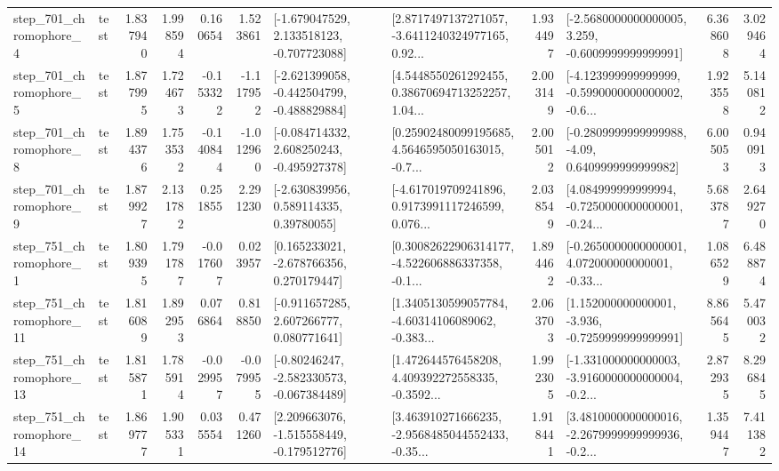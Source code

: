 \begin{tabular}{llrrrrllrlrr}
   step\_701\_chromophore\_4 &      test &      1.837940 &    1.998594 &      0.160654 &  1.523861 &   [-1.679047529, 2.133518123, -0.707723088] &  [2.8717497137271057, -3.6411240324977165, 0.92... &       1.934497 &  [-2.5680000000000005, 3.259, -0.6009999999999991] &            6.368608 &          3.029464 \\
   step\_701\_chromophore\_5 &      test &      1.877995 &    1.724673 &     -0.153322 & -1.117952 &  [-2.621399058, -0.442504799, -0.488829884] &  [4.5448550261292455, 0.38670694713252257, 1.04... &       2.003149 &  [-4.123999999999999, -0.5990000000000002, -0.6... &            1.923558 &          5.140812 \\
   step\_701\_chromophore\_8 &      test &      1.894376 &    1.753532 &     -0.140844 & -1.012960 &   [-0.084714332, 2.608250243, -0.495927378] &  [0.25902480099195685, 4.5646595050163015, -0.7... &       2.005012 &   [-0.2809999999999988, -4.09, 0.6409999999999982] &            6.005053 &          0.940913 \\
   step\_701\_chromophore\_9 &      test &      1.879927 &    2.131782 &      0.251855 &  2.291230 &     [-2.630839956, 0.589114335, 0.39780055] &  [-4.617019709241896, 0.9173991117246599, 0.076... &       2.038549 &  [4.084999999999994, -0.7250000000000001, -0.24... &            5.683787 &          2.649270 \\
   step\_751\_chromophore\_1 &      test &      1.809395 &    1.791787 &     -0.017607 &  0.023957 &    [0.165233021, -2.678766356, 0.270179447] &  [0.30082622906314177, -4.522606886337358, -0.1... &       1.894462 &  [-0.2650000000000001, 4.072000000000001, -0.33... &            1.086529 &          6.488874 \\
  step\_751\_chromophore\_11 &      test &      1.816089 &    1.892953 &      0.076864 &  0.818850 &    [-0.911657285, 2.607266777, 0.080771641] &  [1.3405130599057784, -4.60314106089062, -0.383... &       2.063703 &   [1.152000000000001, -3.936, -0.7259999999999991] &            8.865645 &          5.470032 \\
  step\_751\_chromophore\_13 &      test &      1.815871 &    1.785914 &     -0.029957 & -0.079955 &   [-0.80246247, -2.582330573, -0.067384489] &  [1.472644576458208, 4.409392272558335, -0.3592... &       1.992305 &  [-1.331000000000003, -3.9160000000000004, -0.2... &            2.872935 &          8.296845 \\
  step\_751\_chromophore\_14 &      test &      1.869777 &    1.905331 &      0.035554 &  0.471260 &   [2.209663076, -1.515558449, -0.179512776] &  [3.463910271666235, -2.9568485044552433, -0.35... &       1.918441 &  [3.4810000000000016, -2.2679999999999936, -0.2... &            1.359447 &          7.411382 \\

\end{tabular}
